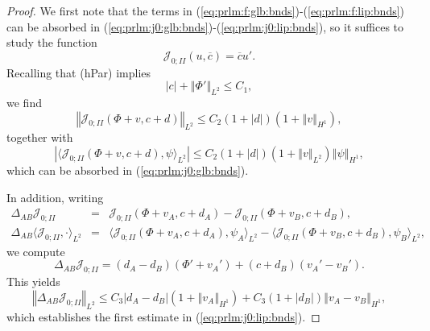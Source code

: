 \documentclass[10pt]{articleHJ}
\newcommand{\abs}[1]{\left\vert#1\right\vert}			%
\newcommand{\norm}[1]{\left\Vert#1\right\Vert}		%
\newcommand{\sref}[1]{(\ref{#1})}                       %
\numberwithin{equation}{section}
\begin{document}
\begin{proof}
We first note that
the terms in
\sref{eq:prlm:f:glb:bnds}-\sref{eq:prlm:f:lip:bnds}
can be absorbed
in
\sref{eq:prlm:j0:glb:bnds}-\sref{eq:prlm:j0:lip:bnds},
so it suffices
to study the function
\begin{equation}
\mathcal{J}_{0;II}(u, \overline{c})
 = \overline{c} u'.
\end{equation}
Recalling that (hPar) implies
\begin{equation}
\abs{c} + \norm{\Phi'}_{L^2} \le C_1,
\end{equation}
we find
\begin{equation}
\norm{
\mathcal{J}_{0;II}(\Phi + v, c + d)
}_{L^2} \le
C_2 ( 1 + \abs{d} )( 1 + \norm{v}_{H^1} ) ,
\end{equation}
together with
\begin{equation}
\abs{
\langle \mathcal{J}_{0;II}(\Phi + v, c + d), \psi \rangle_{L^2}
} \le C_2 ( 1 + \abs{d} )( 1 + \norm{v}_{L^2} )
  \norm{\psi}_{H^1},
\end{equation}
which can be absorbed in
\sref{eq:prlm:j0:glb:bnds}.

In addition, writing
\begin{equation}
\begin{array}{lcl}
\Delta_{AB} \mathcal{J}_{0;II}
  & = &
    \mathcal{J}_{0;II}(\Phi + v_A, c +  d_A)
  - \mathcal{J}_{0;II}(\Phi + v_B, c + d_B) ,
\\[0.2cm]
\Delta_{AB} \langle \mathcal{J}_{0;II}, \cdot \rangle_{L^2}
  & = &
    \langle \mathcal{J}_{0;II}(\Phi + v_A, c +  d_A) , \psi_A \rangle_{L^2}
  - \langle \mathcal{J}_{0;II}(\Phi + v_B, c +  d_B) ,  \psi_B \rangle_{L^2} ,
\end{array}
\end{equation}
we compute
\begin{equation}
\Delta_{AB} \mathcal{J}_{0;II}
= (d_A - d_B ) (\Phi' + v_A')
+ (c + d_B) (v_A' - v_B') .
\end{equation}
This yields
\begin{equation}
\norm{
  \Delta_{AB} \mathcal{J}_{0;II}
}_{L^2}
\le C_3 \abs{d_A - d_B} ( 1 + \norm{v_A}_{H^1} )
+ C_3 (1 + \abs{d_B} )\norm{v_A - v_B}_{H^1},
\end{equation}
which establishes the first estimate
in \sref{eq:prlm:j0:lip:bnds}.


\end{proof}
\end{document}

